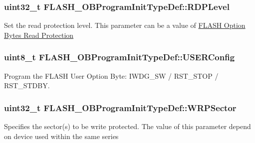 \subsubsection[{\texorpdfstring{R\+D\+P\+Level}{RDPLevel}}]{\setlength{\rightskip}{0pt plus 5cm}uint32\+\_\+t F\+L\+A\+S\+H\+\_\+\+O\+B\+Program\+Init\+Type\+Def\+::\+R\+D\+P\+Level}\hypertarget{struct_f_l_a_s_h___o_b_program_init_type_def_a1f613ba2b87cf9caa84dc1d493e96dae}{}\label{struct_f_l_a_s_h___o_b_program_init_type_def_a1f613ba2b87cf9caa84dc1d493e96dae}
Set the read protection level. This parameter can be a value of \hyperlink{group___f_l_a_s_h_ex___option___bytes___read___protection}{F\+L\+A\+SH Option Bytes Read Protection} 
\subsubsection[{\texorpdfstring{U\+S\+E\+R\+Config}{USERConfig}}]{\setlength{\rightskip}{0pt plus 5cm}uint8\+\_\+t F\+L\+A\+S\+H\+\_\+\+O\+B\+Program\+Init\+Type\+Def\+::\+U\+S\+E\+R\+Config}\hypertarget{struct_f_l_a_s_h___o_b_program_init_type_def_ae6c9b55d49bc9627a2319ba680a924de}{}\label{struct_f_l_a_s_h___o_b_program_init_type_def_ae6c9b55d49bc9627a2319ba680a924de}
Program the F\+L\+A\+SH User Option Byte\+: I\+W\+D\+G\+\_\+\+SW / R\+S\+T\+\_\+\+S\+T\+OP / R\+S\+T\+\_\+\+S\+T\+D\+BY. 
\subsubsection[{\texorpdfstring{W\+R\+P\+Sector}{WRPSector}}]{\setlength{\rightskip}{0pt plus 5cm}uint32\+\_\+t F\+L\+A\+S\+H\+\_\+\+O\+B\+Program\+Init\+Type\+Def\+::\+W\+R\+P\+Sector}\hypertarget{struct_f_l_a_s_h___o_b_program_init_type_def_aa3db423f4b3038a56b67ca2d48af79ff}{}\label{struct_f_l_a_s_h___o_b_program_init_type_def_aa3db423f4b3038a56b67ca2d48af79ff}
Specifies the sector(s) to be write protected. The value of this parameter depend on device used within the same series 
